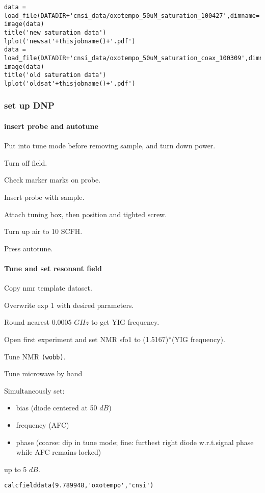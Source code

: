 {{\begin{tiny}
{\begin{lstlisting}
data = load_file(DATADIR+'cnsi_data/oxotempo_50uM_saturation_100427',dimname='power')
image(data)
title('new saturation data')
lplot('newsat'+thisjobname()+'.pdf')
data = load_file(DATADIR+'cnsi_data/oxotempo_50uM_saturation_coax_100309',dimname='power')
image(data)
title('old saturation data')
lplot('oldsat'+thisjobname()+'.pdf')
\end{lstlisting}
}
\end{tiny}


}
}
\subsubsection{set up DNP}
\paragraph{insert probe and autotune}
Put into tune mode before removing sample, and turn down power.

Turn off field.

Check marker marks on probe.

Insert probe with sample.

Attach tuning box, then position and tighted screw.

Turn up air to 10 SCFH.

Press autotune.


\paragraph{Tune and set resonant field}
Copy nmr template dataset.

Overwrite exp 1 with desired parameters.

Round nearest 0.0005 $GHz$ to get YIG frequency.

Open first experiment and set NMR sfo1 to (1.5167)*(YIG frequency).

Tune NMR {\tt (wobb)}.


Tune microwave by hand
{\small Simultaneously set:
\begin{itemize}
    \item bias (diode centered at 50 $dB$)
    \item frequency (AFC)
    \item phase (coarse: dip in tune mode; fine: furthest right diode w.r.t.signal phase while AFC remains locked)
\end{itemize}
up to 5 $dB$.}
\begin{lstlisting}
calcfielddata(9.789948,'oxotempo','cnsi')
\end{lstlisting}

